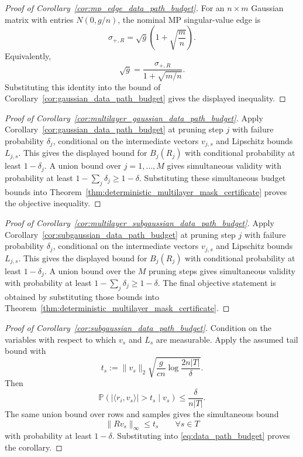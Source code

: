 \documentclass[11pt]{article}
\theoremstyle{plain}
\theoremstyle{definition}
\theoremstyle{remark}
\newcommand{\PP}{\mathbb{P}}
\newcommand{\1}{\mathbf{1}}
\begin{document}
\begin{proof}[Proof of Corollary~\ref{cor:mp_edge_data_path_budget}]
For an \(n\times m\) Gaussian matrix with entries \(N(0,g/n)\), the nominal MP singular-value edge is
\[
\sigma_{+,R}=\sqrt g\left(1+\sqrt{\frac{m}{n}}\right).
\]
Equivalently,
\[
\sqrt g=\frac{\sigma_{+,R}}{1+\sqrt{m/n}}.
\]
Substituting this identity into the bound of Corollary~\ref{cor:gaussian_data_path_budget} gives the displayed inequality.
\end{proof}

\begin{proof}[Proof of Corollary~\ref{cor:multilayer_gaussian_data_path_budget}]
Apply Corollary~\ref{cor:gaussian_data_path_budget} at pruning step \(j\) with failure probability \(\delta_j\), conditional on the intermediate vectors \(v_{j,s}\) and Lipschitz bounds \(L_{j,s}\). This gives the displayed bound for \(B_j(R_j)\) with conditional probability at least \(1-\delta_j\). A union bound over \(j=1,\dots,M\) gives simultaneous validity with probability at least \(1-\sum_j\delta_j\ge1-\delta\). Substituting these simultaneous budget bounds into Theorem~\ref{thm:deterministic_multilayer_mask_certificate} proves the objective inequality.
\end{proof}

\begin{proof}[Proof of Corollary~\ref{cor:multilayer_subgaussian_data_path_budget}]
Apply Corollary~\ref{cor:subgaussian_data_path_budget} at pruning step \(j\) with failure probability \(\delta_j\), conditional on the intermediate vectors \(v_{j,s}\) and Lipschitz bounds \(L_{j,s}\). This gives the displayed bound for \(B_j(R_j)\) with conditional probability at least \(1-\delta_j\). A union bound over the \(M\) pruning steps gives simultaneous validity with probability at least \(1-\sum_j\delta_j\ge1-\delta\). The final objective statement is obtained by substituting those bounds into Theorem~\ref{thm:deterministic_multilayer_mask_certificate}.
\end{proof}

\begin{proof}[Proof of Corollary~\ref{cor:subgaussian_data_path_budget}]
Condition on the variables with respect to which \(v_s\) and \(L_s\) are measurable.
Apply the assumed tail bound with
\[
t_s:=\|v_s\|_2\sqrt{\frac{g}{c n}\log\frac{2n|T|}{\delta}}.
\]
Then
\[
\PP(|\langle r_i,v_s\rangle|>t_s\mid v_s)
\le
\frac{\delta}{n|T|}.
\]
The same union bound over rows and samples gives the simultaneous bound
\[
\|Rv_s\|_\infty\le t_s
\qquad\forall s\in T
\]
with probability at least \(1-\delta\). Substituting into \eqref{eq:data_path_budget} proves the corollary.
\end{proof}
\end{document}
